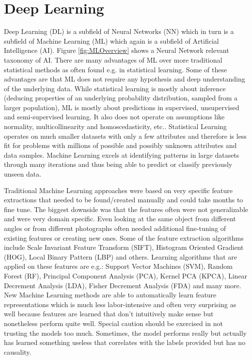 \chapter{Deep Learning}

Deep Learning (DL) is a subfield of Neural Networks (NN) which in turn is a subfield of Machine Learning (ML) which again is a subfield of Artificial Intelligence (AI). Figure \ref{fig:MLOverview} shows a Neural Network relevant taxonomy of AI. There are many advantages of ML over more traditional statistical methods as often found e.g. in statistical learning. Some of these advantages are that ML does not require any hypothesis and deep understanding of the underlying data. While statistical learning is mostly about inference (deducing properties of an underlying probability distribution, sampled from a larger population), ML is mostly about predictions in supervised, unsupervised and semi-supervised learning. It also does not operate on assumptions like normality, multicollinearity and homoscedasticity, etc.. Statistical Learning operates on much smaller datasets with only a few attributes and therefore is less fit for problems with millions of possible and possibly unknown attributes and data samples. Machine Learning excels at identifying patterns in large datasets through many iterations and thus being able to predict or classify previously unseen data.

Traditional Machine Learning approaches were based on very specific feature extractions that needed to be found/created manually and could take months to fine tune. The biggest downside was that the features often were not generalizable and were very domain specific. Even looking at the same object from different angles or from different photographs often needed additional fine-tuning of existing features or creating new ones. Some of the feature extraction algorithms include Scale Invariant Feature Transform (SIFT), Histogram Oriented Gradient (HOG), Local Binary Pattern (LBP) and others. Learning algorithms that are applied on these features are e.g.: Support Vector Machines (SVM), Random Forest (RF), Principal Component Analysis (PCA), Kernel PCA (KPCA), Linear Decrement Analysis (LDA), Fisher Decrement Analysis (FDA) and many more. New Machine Learning methods are able to automatically learn feature representations which is much less labor-intensive and often very surprising as well because features are learned that don't intuitively make sense but nonetheless perform quite well. Special caution should be exercised in not trusting the models too much. Sometimes, the model performs really but actually has learned something useless that correlates with the labels provided but has no causality.

